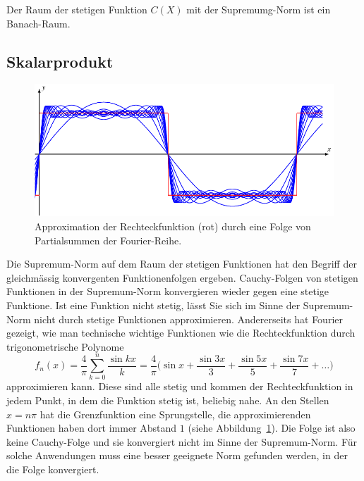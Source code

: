 \begin{satz}
Der Raum der stetigen Funktion $C(X)$ mit der Supremumg-Norm ist
ein Banach-Raum.
\end{satz}

%
%
\subsection{Skalarprodukt
\label{buch:skalarprodukt:subsection:skalarprodukt}}
\begin{figure}
\centering
\includegraphics{chapters/010-skalarprodukt/images/fourierrechteck.pdf}
\caption{Approximation der Rechteckfunktion (rot) durch eine Folge
von Partialsummen der Fourier-Reihe.
\label{buch:skalarprodukt:fig:fourierrechteck}}
\end{figure}%
Die Supremum-Norm auf dem Raum der stetigen Funktionen hat den
Begriff der gleichmässig konvergenten Funktionenfolgen ergeben.
Cauchy-Folgen von stetigen Funktionen in der Supremum-Norm konvergieren
wieder gegen eine stetige Funktione.
Ist eine Funktion nicht stetig, lässt Sie sich im Sinne der Supremum-Norm
nicht durch stetige Funktionen approximieren.
Andererseits hat Fourier gezeigt, wie man technische wichtige Funktionen
wie die Rechteckfunktion durch trigonometrische Polynome
\begin{equation}
f_n(x)
=
\frac{4}{\pi} \sum_{k=0}^n \frac{\sin kx}{k}
=
\frac{4}{\pi} \biggl(
\sin x
+
\frac{\sin 3x}{3}
+
\frac{\sin 5x}{5}
+
\frac{\sin 7x}{7}
+
\ldots
\biggr)
\label{buch:skalarprodukt:eqn:rechteckreihe}
\end{equation}
approximieren kann.
Diese sind alle stetig und kommen der Rechteckfunktion in jedem Punkt,
in dem die Funktion stetig ist, beliebig nahe.
An den Stellen $x = n\pi$ hat die Grenzfunktion eine Sprungstelle,
die approximierenden Funktionen haben dort immer Abstand $1$
(siehe Abbildung~\ref{buch:skalarprodukt:fig:fourierrechteck}).
Die Folge ist also keine Cauchy-Folge und sie konvergiert nicht im
Sinne der Supremum-Norm.
Für solche Anwendungen muss eine besser geeignete Norm gefunden werden,
in der die Folge konvergiert.

